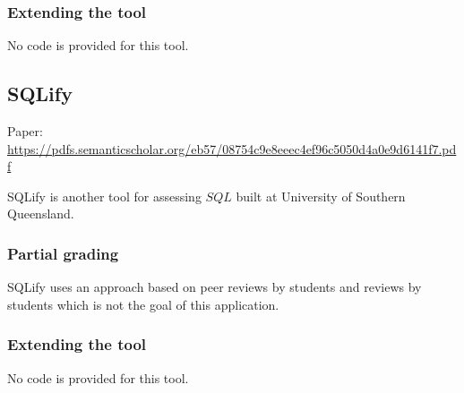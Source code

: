 \subsubsection*{Extending the tool}
No code is provided for this tool.

\subsection{SQLify}
Paper: \url{https://pdfs.semanticscholar.org/eb57/08754c9e8eeec4ef96c5050d4a0e9d6141f7.pdf}

SQLify is another tool for assessing $SQL$ built at University of Southern Queensland.

\subsubsection*{Partial grading}
SQLify uses an approach based on peer reviews by students and reviews by students which is not the goal of this application.

\subsubsection*{Extending the tool}
No code is provided for this tool.
